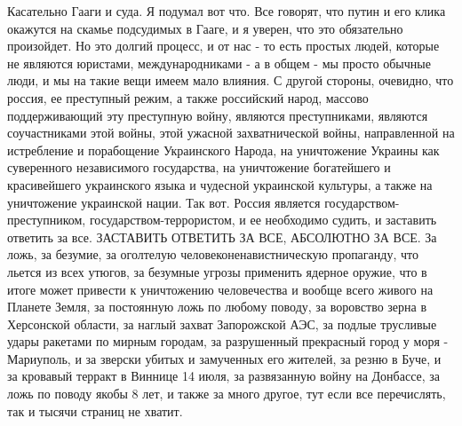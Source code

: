  
 
 
 
 

Касательно Гааги и суда. Я подумал вот что. Все говорят, что путин и его клика
окажутся на скамье подсудимых в Гааге, и я уверен, что это обязательно
произойдет. Но это долгий процесс, и от нас - то есть простых людей, которые не
являются юристами, международниками - а в общем - мы просто обычные люди, и мы
на такие вещи имеем мало влияния. С другой стороны, очевидно, что россия, ее
преступный режим, а также российский народ, массово поддерживающий эту
преступную войну, являются преступниками, являются соучастниками этой войны,
этой ужасной захватнической войны, направленной на истребление и порабощение
Украинского Народа, на уничтожение Украины как суверенного независимого
государства, на уничтожение богатейшего и красивейшего украинского языка и
чудесной украинской культуры, а также на уничтожение украинской нации. Так вот.
Россия является государством-преступником, государством-террористом, и ее
необходимо судить, и заставить ответить за все. ЗАСТАВИТЬ ОТВЕТИТЬ ЗА ВСЕ,
АБСОЛЮТНО ЗА ВСЕ. За ложь, за безумие, за оголтелую человеконенавистническую
пропаганду, что льется из всех утюгов, за безумные угрозы применить ядерное
оружие, что в итоге может привести к уничтожению человечества и вообще всего
живого на Планете Земля, за постоянную ложь по любому поводу, за воровство
зерна в Херсонской области, за наглый захват Запорожской АЭС, за подлые
трусливые удары ракетами по мирным городам, за разрушенный прекрасный город у
моря - Мариуполь, и за зверски убитых и замученных его жителей, за резню в
Буче, и за кровавый терракт в Виннице 14 июля, за развязанную войну на
Донбассе, за ложь по поводу якобы 8 лет, и также за много другое, тут если все
перечислять, так и тысячи страниц не хватит.

